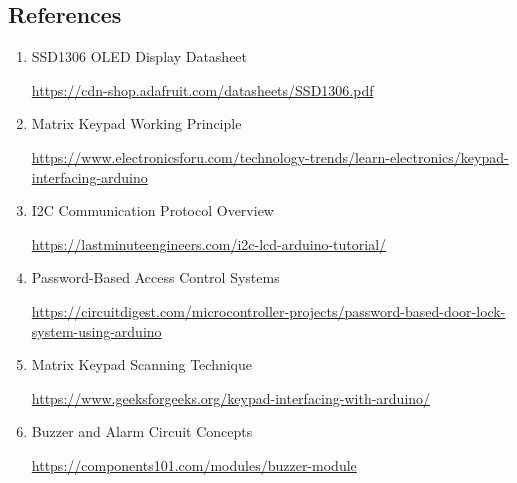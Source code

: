 
\subsection{References}

\begin{enumerate}

\item SSD1306 OLED Display Datasheet

\url{https://cdn-shop.adafruit.com/datasheets/SSD1306.pdf}

\item Matrix Keypad Working Principle

\url{https://www.electronicsforu.com/technology-trends/learn-electronics/keypad-interfacing-arduino}

\item I2C Communication Protocol Overview

\url{https://lastminuteengineers.com/i2c-lcd-arduino-tutorial/}

\item Password-Based Access Control Systems

\url{https://circuitdigest.com/microcontroller-projects/password-based-door-lock-system-using-arduino}

\item Matrix Keypad Scanning Technique

\url{https://www.geeksforgeeks.org/keypad-interfacing-with-arduino/}

\item Buzzer and Alarm Circuit Concepts

\url{https://components101.com/modules/buzzer-module}

\end{enumerate}


\clearpage